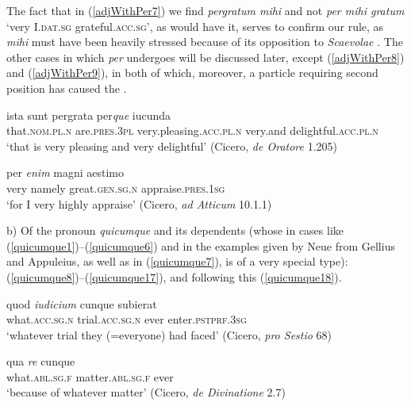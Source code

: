 The fact that in (\ref{adjWithPer7}) we find \emph{pergratum mihi} and not \emph{per mihi gratum} `very I.\textsc{dat.sg} grateful.\textsc{acc.sg}', as \citet{Orelli1828} would have it, serves to confirm our rule, as \emph{mihi} must have been heavily stressed because of its opposition to \emph{Scaevolae} \citep[95]{SeyffertMueller1876}. The other cases in which \emph{per} undergoes  will be discussed later, except (\ref{adjWithPer8}) and (\ref{adjWithPer9}), in both of which, moreover, a particle requiring second position has caused the .

\begin{exe}
\ex
\gll ista sunt pergrata per\emph{que} iucunda\\
that.\textsc{nom.pl.n} are.\textsc{pres.3pl} very.pleasing.\textsc{acc.pl.n} very.and delightful.\textsc{acc.pl.n}\\
\trans `that is very pleasing and very delightful' (Cicero, \textit{de Oratore} 1.205)
\label{adjWithPer8}
\end{exe}

\begin{exe}
\ex
\gll per \emph{enim} magni aestimo\\
very namely great.\textsc{gen.sg.n} appraise.\textsc{pres.1sg}\\
\trans `for I very highly appraise' (Cicero, \textit{ad Atticum} 10.1.1)
\label{adjWithPer9}
\end{exe}

b) Of the pronoun \emph{quicumque} \citep[489]{NeueWagener1892} and its dependents (whose  in cases like (\ref{quicumque1})--(\ref{quicumque6}) and in the examples given by Neue from Gellius and Appuleius, as well as in (\ref{quicumque7}), is of a very special type): (\ref{quicumque8})--(\ref{quicumque17}), and following this (\ref{quicumque18}).

\begin{exe}
\ex
\gll quod \emph{iudicium} cunque subierat\\
what.\textsc{acc.sg.n} trial.\textsc{acc.sg.n} ever enter.\textsc{pstprf.3sg}\\
\trans `whatever trial they (=everyone) had faced' (Cicero, \textit{pro Sestio} 68)
\label{quicumque1}
\end{exe}

\begin{exe}
\ex
\gll qua \emph{re} cunque\\
what.\textsc{abl.sg.f} matter.\textsc{abl.sg.f} ever\\
\trans `because of whatever matter' (Cicero, \textit{de Divinatione} 2.7)
\label{quicumque2}
\end{exe}

